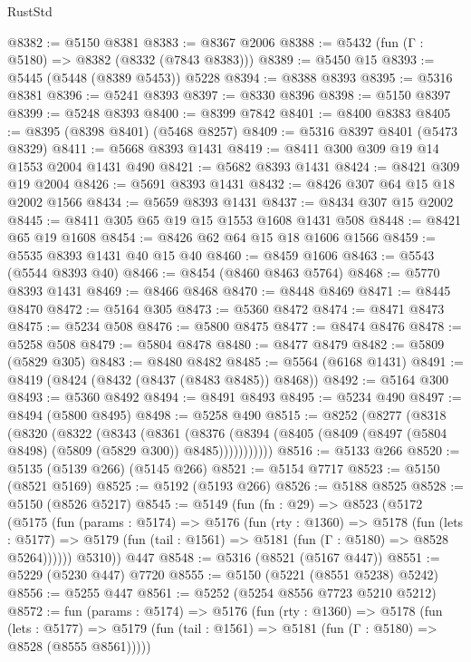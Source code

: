 \begin{lexlean}{RustStd}
\begin{coremodule}
@8382 := @5150 @8381
@8383 := @8367 @2006
@8388 := @5432 (fun (Γ : @5180) => @8382 (@8332 (@7843 @8383)))
@8389 := @5450 @15
@8393 := @5445 (@5448 (@8389 @5453)) @5228
@8394 := @8388 @8393
@8395 := @5316 @8381
@8396 := @5241 @8393
@8397 := @8330 @8396
@8398 := @5150 @8397
@8399 := @5248 @8393
@8400 := @8399 @7842
@8401 := @8400 @8383
@8405 := @8395 (@8398 @8401) (@5468 @8257)
@8409 := @5316 @8397 @8401 (@5473 @8329)
@8411 := @5668 @8393 @1431
@8419 := @8411 @300 @309 @19 @14 @1553 @2004 @1431 @490
@8421 := @5682 @8393 @1431
@8424 := @8421 @309 @19 @2004
@8426 := @5691 @8393 @1431
@8432 := @8426 @307 @64 @15 @18 @2002 @1566
@8434 := @5659 @8393 @1431
@8437 := @8434 @307 @15 @2002
@8445 := @8411 @305 @65 @19 @15 @1553 @1608 @1431 @508
@8448 := @8421 @65 @19 @1608
@8454 := @8426 @62 @64 @15 @18 @1606 @1566
@8459 := @5535 @8393 @1431 @40 @15 @40
@8460 := @8459 @1606
@8463 := @5543 (@5544 @8393 @40)
@8466 := @8454 (@8460 @8463 @5764)
@8468 := @5770 @8393 @1431
@8469 := @8466 @8468
@8470 := @8448 @8469
@8471 := @8445 @8470
@8472 := @5164 @305
@8473 := @5360 @8472
@8474 := @8471 @8473
@8475 := @5234 @508
@8476 := @5800 @8475
@8477 := @8474 @8476
@8478 := @5258 @508
@8479 := @5804 @8478
@8480 := @8477 @8479
@8482 := @5809 (@5829 @305)
@8483 := @8480 @8482
@8485 := @5564 (@6168 @1431)
@8491 := @8419 (@8424 (@8432 (@8437 (@8483 @8485)) @8468))
@8492 := @5164 @300
@8493 := @5360 @8492
@8494 := @8491 @8493
@8495 := @5234 @490
@8497 := @8494 (@5800 @8495)
@8498 := @5258 @490
@8515 := @8252
    (@8277
      (@8318
        (@8320
          (@8322
            (@8343
              (@8361
                (@8376
                  (@8394 (@8405 (@8409 (@8497 (@5804 @8498) (@5809 (@5829 @300)) @8485)))))))))))
@8516 := @5133 @266
@8520 := @5135 (@5139 @266) (@5145 @266)
@8521 := @5154 @7717
@8523 := @5150 (@8521 @5169)
@8525 := @5192 (@5193 @266)
@8526 := @5188 @8525
@8528 := @5150 (@8526 @5217)
@8545 := @5149
    (fun (fn : @29) =>
    @8523
      (@5172
        (@5175
          (fun (params : @5174) =>
          @5176
            (fun (rty : @1360) =>
            @5178
              (fun (lets : @5177) =>
              @5179 (fun (tail : @1561) => @5181 (fun (Γ : @5180) => @8528 @5264))))))
        @5310))
    @447
@8548 := @5316 (@8521 (@5167 @447))
@8551 := @5229 (@5230 @447) @7720
@8555 := @5150 (@5221 (@8551 @5238) @5242)
@8556 := @5255 @447
@8561 := @5252 (@5254 @8556 @7723 @5210 @5212)
@8572 := fun (params : @5174) =>
  @5176
    (fun (rty : @1360) =>
    @5178
      (fun (lets : @5177) =>
      @5179 (fun (tail : @1561) => @5181 (fun (Γ : @5180) => @8528 (@8555 @8561)))))

\end{coremodule}
\end{lexlean}
